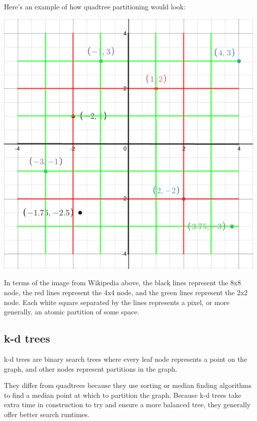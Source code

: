 \documentclass{article}
\begin{document}
Here's an example of how quadtree partitioning would look:

\begin{center}
  \includegraphics[width=.5\textwidth]{desmos-quad}
\end{center}

In terms of the image from Wikipedia above, the black lines represent the 8x8 node, the red lines represent the 4x4 node, and the green lines represent the 2x2 node.
Each white square separated by the lines represents a pixel, or more generally, an atomic partition of some space.

\subsection{k-d trees}
k-d trees are binary search trees where every leaf node represents a point on the graph, and other nodes represent partitions in the graph.

They differ from quadtrees because they use sorting or median finding algorithms to find a median point at which to partition the graph.
Because k-d trees take extra time in construction to try and ensure a more balanced tree, they generally offer better search runtimes.
\end{document}
